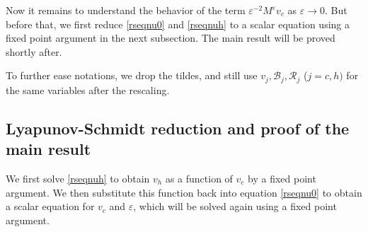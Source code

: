 \documentclass[letterpaper,11pt]{article}
\newcommand{\eps}{\varepsilon}
\newcommand{\B}{\mathcal{B}}
\newcommand{\Rm}{\mathcal{R}}
\numberwithin{equation}{section}
\theoremstyle{plain}
\theoremstyle{remark}
\begin{document}
Now it remains to understand the behavior of the term $\eps^{-2}M^\eps v_c$ as $\eps \to 0$. But before that, we first reduce \eqref{rseqnu0} and \eqref{rseqnuh} to a scalar equation using a fixed point argument in the next subsection. The main result will be proved shortly after.

To further ease notations, we drop the tildes, and still use $v_j,\B_j,\Rm_j$ ($j=c,h)$ for the same variables after the rescaling. 



\subsection{Lyapunov-Schmidt reduction and proof of the main result}
We first solve \eqref{rseqnuh} to obtain $v_h$ as a function of $v_c$ by a fixed point argument. We then substitute this function back into equation \eqref{rseqnu0} to obtain a scalar equation for $v_c$ and $\eps$, which will be solved again using a fixed point argument.
\end{document}
